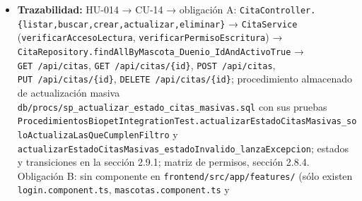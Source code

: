 \documentclass[
  spanish,
]{article}
\begin{document}
\begin{itemize}
  \texttt{crear\allowbreak{}Cita\allowbreak{}Con\allowbreak{}Usuario\allowbreak{}No\allowbreak{}Veterinario\allowbreak{}Asignado\allowbreak{}Devuelve400},
  \texttt{crear\allowbreak{}Cita\allowbreak{}Con\allowbreak{}Campos\allowbreak{}Invalidos\allowbreak{}Devuelve422} (A5);
  \texttt{admin\allowbreak{}Elimina\allowbreak{}Cita\allowbreak{}Devuelve204\allowbreak{}YBaja\allowbreak{}Logica} (A6). Obligación B ---
  \textbf{verificación prevista}, no ejecutable hoy: componente Angular
  en \texttt{frontend/\allowbreak{}src/\allowbreak{}app/\allowbreak{}features/} consumiendo
  \texttt{GET\ /\allowbreak{}api/\allowbreak{}citas}, con corrida Lighthouse sobre la nueva ruta
  (B5) e inspección manual por rol (B1 a B4).
\item
  \textbf{Trazabilidad:} HU-014 → CU-14 → obligación A:
  \texttt{Cita\allowbreak{}Controller.\allowbreak{}\{listar,\allowbreak{}buscar,\allowbreak{}crear,\allowbreak{}actualizar,\allowbreak{}eliminar\}} →
  \texttt{Cita\allowbreak{}Service} (\texttt{verificar\allowbreak{}Acceso\allowbreak{}Lectura},
  \texttt{verificar\allowbreak{}Permiso\allowbreak{}Escritura}) →
  \texttt{Cita\allowbreak{}Repository.\allowbreak{}find\allowbreak{}All\allowbreak{}By\allowbreak{}Mascota\_\allowbreak{}Duenio\_\allowbreak{}Id\allowbreak{}And\allowbreak{}Activo\allowbreak{}True} →
  \texttt{GET\ /\allowbreak{}api/\allowbreak{}citas}, \texttt{GET\ /\allowbreak{}api/\allowbreak{}citas/\allowbreak{}\{id\}},
  \texttt{POST\ /\allowbreak{}api/\allowbreak{}citas}, \texttt{PUT\ /\allowbreak{}api/\allowbreak{}citas/\allowbreak{}\{id\}},
  \texttt{DELETE\ /\allowbreak{}api/\allowbreak{}citas/\allowbreak{}\{id\}}; procedimiento almacenado de
  actualización masiva
  \texttt{db/\allowbreak{}procs/\allowbreak{}sp\_\allowbreak{}actualizar\_\allowbreak{}esta\allowbreak{}do\_\allowbreak{}citas\_\allowbreak{}masivas.\allowbreak{}sql} con sus
  pruebas
  \texttt{Procedimientos\allowbreak{}Biopet\allowbreak{}Integration\allowbreak{}Test.\allowbreak{}actualizar\allowbreak{}Estado\allowbreak{}Citas\allowbreak{}Masivas\_\allowbreak{}solo\allowbreak{}Actualiza\allowbreak{}Las\allowbreak{}Que\allowbreak{}Cumplen\allowbreak{}Filtro}
  y
  \texttt{actualizar\allowbreak{}Estado\allowbreak{}Citas\allowbreak{}Masivas\_\allowbreak{}estado\allowbreak{}Invalido\_\allowbreak{}lanza\allowbreak{}Excepcion};
  estados y transiciones en la sección 2.9.1; matriz de permisos,
  sección 2.8.4. Obligación B: sin componente en
  \texttt{frontend/\allowbreak{}src/\allowbreak{}app/\allowbreak{}features/} (sólo existen
  \texttt{login.\allowbreak{}component.\allowbreak{}ts}, \texttt{mascotas.\allowbreak{}component.\allowbreak{}ts} y

\end{itemize}
\end{document}
